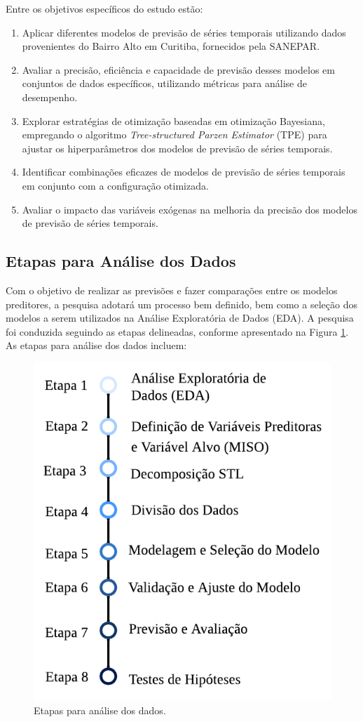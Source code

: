 Entre os objetivos específicos do estudo estão:
\begin{enumerate}
	
	\item Aplicar diferentes modelos de previsão de séries temporais utilizando dados provenientes do Bairro Alto em Curitiba, fornecidos pela SANEPAR.
	
	\item Avaliar a precisão, eficiência e capacidade de previsão desses modelos em conjuntos de dados específicos, utilizando métricas para análise de desempenho.
	
	\item Explorar estratégias de otimização baseadas em otimização Bayesiana, empregando o algoritmo \textit{Tree-structured Parzen Estimator} (TPE) para ajustar os hiperparâmetros dos modelos de previsão de séries temporais.
	
	\item Identificar combinações eficazes de modelos de previsão de séries temporais em conjunto com a configuração otimizada. 
	
	\item Avaliar o impacto das variáveis exógenas na melhoria da precisão dos modelos de previsão de séries temporais.
	
\end{enumerate}

\subsection{Etapas para An\'alise dos Dados} 
\label{subsec:metod}

Com o objetivo de realizar as previsões e fazer comparações entre os modelos preditores, a pesquisa adotará um processo bem definido, bem como a seleção dos modelos a serem utilizados na Análise Exploratória de Dados (EDA). A pesquisa foi conduzida seguindo as etapas delineadas, conforme apresentado na Figura \ref{fig:etapas}.
As etapas para análise dos dados incluem:

\begin{figure}[!htb]
	\centering
	\caption{Etapas para análise dos dados.}
	\label{fig:etapas}
	\includegraphics[width=0.7\linewidth]{Introducao/Figuras/Etapas}
\end{figure}

